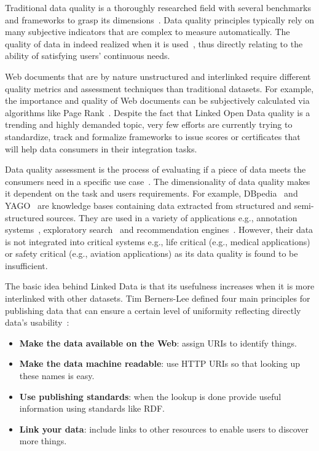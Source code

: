 \documentclass[a4paper,11pt,twoside]{ThesisStyle}
\begin{document}
Traditional data quality is a thoroughly researched field with several benchmarks and frameworks to grasp its dimensions~\cite{Kahn:ACM:02,Stvilia:ASIST:07,Wang:MIS:96}. Data quality principles typically rely on many subjective indicators that are complex to measure automatically. The quality of data in indeed realized when it is used~\cite{Juran:McGraw:99}, thus directly relating to the ability of satisfying users' continuous needs.

Web documents that are by nature unstructured and interlinked require different quality metrics and assessment techniques than traditional datasets. For example, the importance and quality of Web documents can be subjectively calculated via algorithms like Page Rank~\cite{ Page:TechReport:98}. Despite the fact that Linked Open Data quality is a trending and highly demanded topic, very few efforts are currently trying to standardize, track and formalize frameworks to issue scores or certificates that will help data consumers in their integration tasks.

Data quality assessment is the process of evaluating if a piece of data meets the consumers need in a specific use case~\cite{Bizer:WebSemantics:09}. The dimensionality of data quality makes it dependent on the task and users requirements. For example, DBpedia~\cite{Bizer:WebSemJorunal:09} and YAGO~\cite{Suchanek::WWW:07} are knowledge bases containing data extracted from structured and semi-structured sources. They are used in a variety of applications  e.g., annotation systems~\cite{Mendes:ICS:11}, exploratory search~\cite{Marie:ICS:13} and recommendation engines~\cite{DiNoia:iSemantics:12}. However, their data is not integrated into critical systems e.g., life critical (e.g., medical applications) or safety critical (e.g., aviation applications) as its data quality is found to be insufficient.

The basic idea behind Linked Data is that its usefulness increases when it is more interlinked with other datasets. Tim Berners-Lee defined four main principles for publishing data that can ensure a certain level of uniformity reflecting directly data's usability~\cite{Berners-Lee:W3C:06}:

\begin{itemize}
	\item \textbf{Make the data available on the Web}: assign URIs to identify things.
	\item \textbf{Make the data machine readable}: use HTTP URIs so that looking up these names is easy.
	\item \textbf{Use publishing standards}: when the lookup is done provide useful information using standards like RDF.
	\item \textbf{Link your data}: include links to other resources to enable users to discover more things.
\end{itemize}
\end{document}
